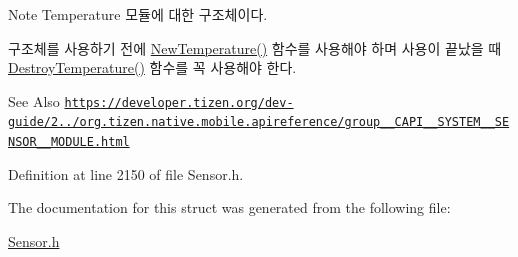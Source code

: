 \begin{DoxyNote}{Note}
Temperature 모듈에 대한 구조체이다. \par
 구조체를 사용하기 전에 \hyperlink{Sensor_8h_afd32f5f2a72ba185361018d8f2b450f7}{New\-Temperature()} 함수를 사용해야 하며 사용이 끝났을 때 \hyperlink{Sensor_8h_a31db7bd04fb88393523fe985fe007023}{Destroy\-Temperature()} 함수를 꼭 사용해야 한다. 
\end{DoxyNote}
\begin{DoxySeeAlso}{See Also}
\href{https://developer.tizen.org/dev-guide/2.3.0/org.tizen.native.mobile.apireference/group__CAPI__SYSTEM__SENSOR__MODULE.html}{\tt https\-://developer.\-tizen.\-org/dev-\/guide/2../org.\-tizen.\-native.\-mobile.\-apireference/group\-\_\-\-\_\-\-C\-A\-P\-I\-\_\-\-\_\-\-S\-Y\-S\-T\-E\-M\-\_\-\-\_\-\-S\-E\-N\-S\-O\-R\-\_\-\-\_\-\-M\-O\-D\-U\-L\-E.\-html} 
\end{DoxySeeAlso}


Definition at line 2150 of file Sensor.\-h.



The documentation for this struct was generated from the following file\-:\begin{DoxyCompactItemize}
\item 
\hyperlink{Sensor_8h}{Sensor.\-h}\end{DoxyCompactItemize}
